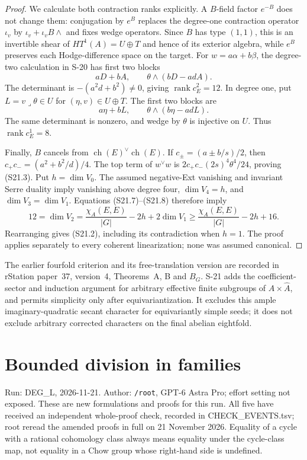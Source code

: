 \documentclass[11pt,a4paper]{article}
\theoremstyle{definition}
\begin{document}
\begin{proof}
We calculate both contraction ranks explicitly. A
$B$-field factor $e^{-B}$ does not change them:
conjugation by $e^B$ replaces the degree-one contraction
operator $\iota_v$ by $\iota_v+\iota_vB\wedge$ and fixes
wedge operators. Since $B$ has type $(1,1)$, this is an
invertible shear of $HT^1(A)=U\oplus T$ and hence of its
exterior algebra, while $e^B$ preserves each Hodge-difference
space on the target.
For $w=a\alpha+b\beta$, the degree-two calculation in S-20
has first two blocks
\[
 aD+bA,\qquad\theta\wedge(bD-adA).
\]
The determinant is $-(a^2d+b^2)\ne0$, giving
$\operatorname{rank}c_E^2=12$.
In degree one, put $L=v\mathbin{\lrcorner}\theta\in U$
for $(\eta,v)\in U\oplus T$.
The first two blocks are
\[
 a\eta+bL,\qquad\theta\wedge(b\eta-adL).
\]
The same determinant is nonzero, and wedge by $\theta$
is injective on $U$. Thus $\operatorname{rank}c_E^1=8$.

Finally, $B$ cancels from $\operatorname{ch}(E)^\vee
\operatorname{ch}(E)$. If
$c_\pm=(a\pm b/s)/2$, then
$c_+c_-=(a^2+b^2/d)/4$.
The top term of $w^\vee w$ is
$2c_+c_-(2s)^4\theta^4/24$, proving (S21.3).
Put $h=\dim V_0$. The assumed negative-Ext vanishing and
invariant Serre duality imply vanishing above degree four,
$\dim V_4=h$, and $\dim V_3=\dim V_1$.
Equations (S21.7)--(S21.8) therefore imply
\[
 12=\dim V_2
 =\frac{\chi_A(E,E)}{|G|}-2h+2\dim V_1
 \ge\frac{\chi_A(E,E)}{|G|}-2h+16.
\]
Rearranging gives (S21.2), including its contradiction
when $h=1$. The proof applies separately to every coherent
linearization; none was assumed canonical.
\end{proof}

The earlier fourfold criterion and its free-translation
version are recorded in rStation paper~37, version~4,
Theorems~A, B and $B_G$. S-21 adds the coefficient-sector
and induction argument for arbitrary effective finite
subgroups of $A\times\widehat A$, and permits simplicity
only after equivariantization. It excludes this ample
imaginary-quadratic secant character for equivariantly
simple seeds; it does not exclude arbitrary corrected
characters on the final abelian eightfold.

\section{Bounded division in families}

Run: DEG\_L, 2026-11-21. Author: \texttt{/root}, GPT-6 Astra Pro; effort
setting not exposed. These are new formulations and proofs for this run.
All five have received an independent whole-proof check, recorded in
CHECK\_EVENTS.tsv; root reread the amended proofs in full on 21 November
2026. Equality of a cycle with a rational cohomology class always means
equality under the cycle-class map, not equality in a Chow group whose
right-hand side is undefined.
\end{document}
